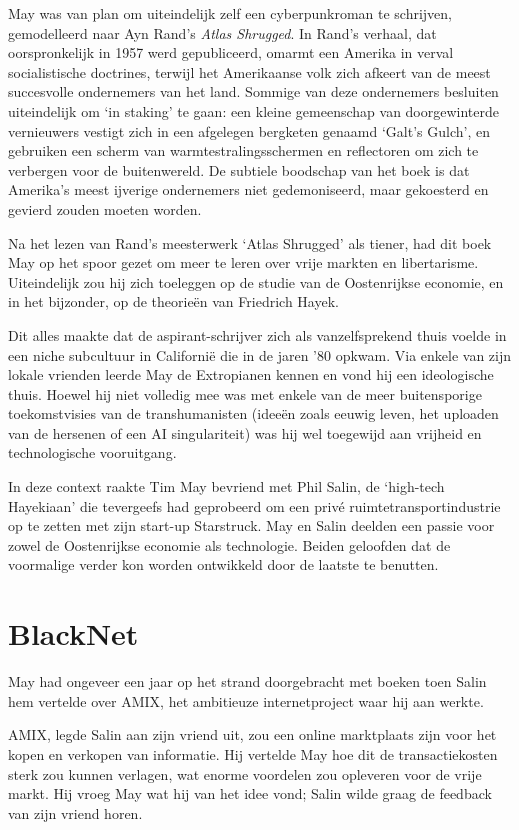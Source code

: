\documentclass[
  a5paper,
  smalldemyvopaper,11pt,twoside,onecolumn,openright,extrafontsizes]{memoir}
\begin{document}
May was van plan om uiteindelijk zelf een cyberpunkroman te schrijven,
gemodelleerd naar Ayn Rand's \emph{Atlas Shrugged}. In Rand's verhaal,
dat oorspronkelijk in 1957 werd gepubliceerd, omarmt een Amerika in
verval socialistische doctrines, terwijl het Amerikaanse volk zich
afkeert van de meest succesvolle ondernemers van het land. Sommige van
deze ondernemers besluiten uiteindelijk om `in staking' te gaan: een
kleine gemeenschap van doorgewinterde vernieuwers vestigt zich in een
afgelegen bergketen genaamd `Galt's Gulch', en gebruiken een scherm van
warmtestralingsschermen en reflectoren om zich te verbergen voor de
buitenwereld. De subtiele boodschap van het boek is dat Amerika's meest
ijverige ondernemers niet gedemoniseerd, maar gekoesterd en gevierd
zouden moeten worden.

Na het lezen van Rand's meesterwerk `Atlas Shrugged' als tiener, had dit
boek May op het spoor gezet om meer te leren over vrije markten en
libertarisme. Uiteindelijk zou hij zich toeleggen op de studie van de
Oostenrijkse economie, en in het bijzonder, op de theorieën van
Friedrich Hayek.

Dit alles maakte dat de aspirant-schrijver zich als vanzelfsprekend
thuis voelde in een niche subcultuur in Californië die in de jaren '80
opkwam. Via enkele van zijn lokale vrienden leerde May de Extropianen
kennen en vond hij een ideologische thuis. Hoewel hij niet volledig mee
was met enkele van de meer buitensporige toekomstvisies van de
transhumanisten (ideeën zoals eeuwig leven, het uploaden van de hersenen
of een AI singulariteit) was hij wel toegewijd aan vrijheid en
technologische vooruitgang.

In deze context raakte Tim May bevriend met Phil Salin, de `high-tech
Hayekiaan' die tevergeefs had geprobeerd om een privé
ruimtetransportindustrie op te zetten met zijn start-up Starstruck. May
en Salin deelden een passie voor zowel de Oostenrijkse economie als
technologie. Beiden geloofden dat de voormalige verder kon worden
ontwikkeld door de laatste te benutten.

\section{BlackNet}\label{blacknet}

May had ongeveer een jaar op het strand doorgebracht met boeken toen
Salin hem vertelde over AMIX, het ambitieuze internetproject waar hij
aan werkte.

AMIX, legde Salin aan zijn vriend uit, zou een online marktplaats zijn
voor het kopen en verkopen van informatie. Hij vertelde May hoe dit de
transactiekosten sterk zou kunnen verlagen, wat enorme voordelen zou
opleveren voor de vrije markt. Hij vroeg May wat hij van het idee vond;
Salin wilde graag de feedback van zijn vriend horen.
\end{document}
